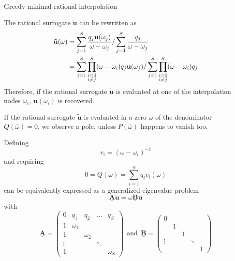 \documentclass[11pt, a4paper]{article}
\begin{document}
\citep{shortMRI}

\begin{algorithm}
    \caption{Greedy minimal rational interpolation} \label{alg:gMRI}
    
\end{algorithm}

The rational surrogate $\mathbf{\tilde{u}}$ can be rewritten as 
\begin{align}
    \mathbf{\tilde{u}}(\omega)
    &= \sum_{j=1}^S \frac{q_j \mathbf{u}(\omega_j)}{\omega - \omega_j}
    / \sum_{j=1}^S \frac{q_j}{\omega - \omega_j} \notag \\
    &= \sum_{j=1}^S \prod_{\substack{i=0 \\ i \neq j}}^S (\omega - \omega_i) q_j \mathbf{u}(\omega_j)
    / \sum_{j=1}^S \prod_{\substack{i=0 \\ i \neq j}}^S (\omega - \omega_i) q_j
\end{align}
Therefore, if the rational surrogate $\mathbf{\tilde{u}}$ is evaluated at one of the
interpolation nodes $\omega_i$, $\mathbf{u}(\omega_i)$ is recovered.

If the rational surrogate $\mathbf{\tilde{u}}$ is evaluated in a zero
$\bar{\omega}$ of the denominator $Q(\bar{\omega}) = 0$, we observe a pole,
unless $P(\bar{\omega})$ happens to vanish too.


\citep{klein}

Defining 
\begin{equation}
    v_i = (\omega - \omega_i)^{-1}
\end{equation}
and requiring
\begin{equation}
    0 = Q(\omega) = \sum_{i=1}^S q_i v_i(\omega)
\end{equation}
can be equivalently expressed as a generalized eigenvalue problem
\begin{equation}
    \mathbf{\underline{A}} \mathbf{u} = \omega \mathbf{\underline{B}} \mathbf{u}
\end{equation}
with
\begin{equation}
    \mathbf{\underline{A}} = \begin{pmatrix}
        0 & q_1 & q_2 & \dots & q_S \\
        1 & \omega_1 & & & \\
        1 & & \omega_2 & & \\ 
        \vdots & & & \ddots & \\ 
        1 & & & & \omega_S
    \end{pmatrix} ~~\text{and}~~
    \mathbf{\underline{B}} = \begin{pmatrix}
        0 & & & & \\
         & 1 & & & \\
         & & 1 & & \\ 
        \vdots & & & \ddots & \\ 
         & & & & 1
    \end{pmatrix}\label{equ:root-finding}
\end{equation}
\end{document}
